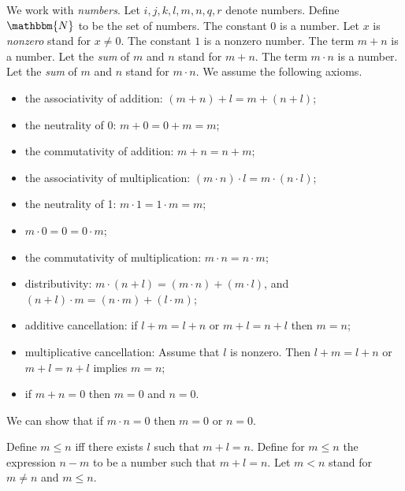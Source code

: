 \documentclass{letter}
\newcommand{\tmem}[1]{{\em #1\/}}
\newenvironment{itemizeminus}{\begin{itemize} \renewcommand{\labelitemi}{$-$}\renewcommand{\labelitemii}{$-$}\renewcommand{\labelitemiii}{$-$}\renewcommand{\labelitemiv}{$-$}}{\end{itemize}}
\begin{document}
We work with {\tmem{numbers}}. Let $i, j, k, l, m, n, q, r$ denote numbers.
Define $\mathbbm{N}$ to be the set of numbers. The constant $0$ is a number.
Let $x$ is {\tmem{nonzero}} stand for $x \neq 0$. The constant $1$ is a
nonzero number. The term $m + n$ is a number. Let the {\tmem{sum}} of $m$ and
$n$ stand for $m + n$. The term $m \cdot n$ is a number. Let the {\tmem{sum}}
of $m$ and $n$ stand for $m \cdot n$. We assume the following axioms.
\begin{itemizeminus}
  \item the associativity of addition: $\left( m + n \right) + l = m + \left(
  n + l \right)$;
  
  \item the neutrality of 0: $m + 0 = 0 + m = m$;
  
  \item the commutativity of addition: $m + n = n + m$;
  
  \item the associativity of multiplication: $\left( m \cdot n \right) \cdot l
  = m \cdot \left( n \cdot l \right)$;
  
  \item the neutrality of 1: $m \cdot 1 = 1 \cdot m = m$;
  
  \item $m \cdot 0 = 0 = 0 \cdot m$;
  
  \item the commutativity of multiplication: $m \cdot n = n \cdot m$;
  
  \item distributivity: $m \cdot \left( n + l \right) = \left( m \cdot n
  \right) + \left( m \cdot l \right)$, and $\left( n + l \right) \cdot m =
  \left( n \cdot m \right) + \left( l \cdot m \right)$;
  
  \item additive cancellation: if $l + m = l + n$ or $m + l = n + l$ then $m =
  n$;
  
  \item multiplicative cancellation: Assume that $l$ is nonzero. Then $l + m =
  l + n$ or $m + l = n + l$ implies $m = n$;
  
  \item if $m + n = 0$ then $m = 0$ and $n = 0$.
\end{itemizeminus}
We can show that if $m \cdot n = 0$ then $m = 0$ or $n = 0$.

Define $m \leq n$ iff there exists $l$ such that $m + l = n$. Define for $m
\leq n$ the expression $n - m$ to be a number such that $m + l = n$. Let $m <
n$ stand for $m \neq n$ and $m \leq n$.
\end{document}
